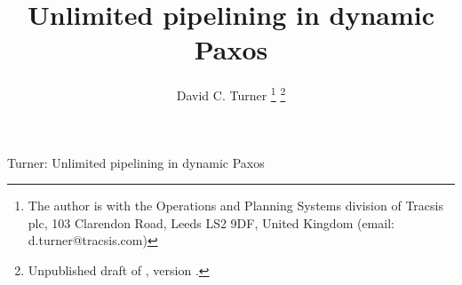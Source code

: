 \documentclass[journal]{IEEEtran}
\def\mytitle{Unlimited pipelining in dynamic Paxos}
\begin{document}
%
\title{\mytitle}
%
%
%

\author{David C. Turner%
\thanks{The author is with the Operations and Planning Systems division of
Tracsis plc, 103 Clarendon Road, Leeds LS2 9DF, United Kingdom (email:
d.turner@tracsis.com)
}%
\thanks{Unpublished draft of \pubdate, version \gitid.}%
}

% 
%



\markboth{}%
{Turner: \mytitle}
% 
\end{document}
